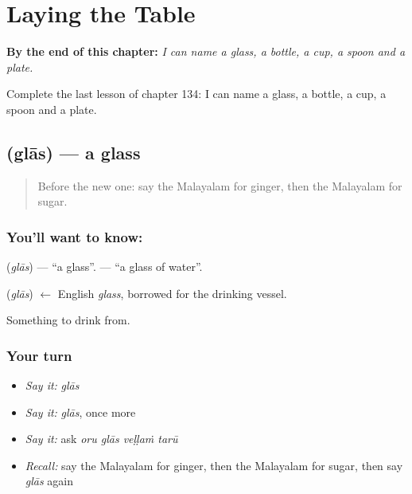
\chapter{Laying the Table}
\label{ch:ml-laying-the-table}

\begin{chapteropening}
\textbf{By the end of this chapter:} \emph{I can name a glass, a bottle, a cup, a spoon and a plate.}

Complete the last lesson of chapter 134: I can name a glass, a bottle, a cup, a spoon and a plate.
\end{chapteropening}

\section[\texorpdfstring{\ml{ഗ്ലാസ്} (glās)}{ഗ്ലാസ് (glās)}]{ (glās) — a glass}

\label{lesson:ML-C134-glass}



\begin{quote}
Before the new one: say the Malayalam for ginger, then the Malayalam for sugar.
\end{quote}

\subsection*{You'll want to know: }
\textbf{} (\emph{glās}) — \textquotedblleft{}a glass\textquotedblright{}. \textbf{  } — \textquotedblleft{}a glass of water\textquotedblright{}.

\begin{cousinweb}
\textbf{} (\emph{glās}) $\leftarrow$ English \emph{glass}, borrowed for the drinking vessel.
\end{cousinweb}

\begin{grammarlens}[title={What you've built}]
Something to drink from.
\end{grammarlens}

\subsection*{Your turn}
\begin{itemize}
\raggedright
  \item \emph{Say it:} \emph{glās}
  \item \emph{Say it:} \emph{glās}, once more
  \item \emph{Say it:} ask \emph{oru glās veḷḷaṁ tarū}
  \item \emph{Recall:} say the Malayalam for ginger, then the Malayalam for sugar, then say \emph{glās} again
\end{itemize}

